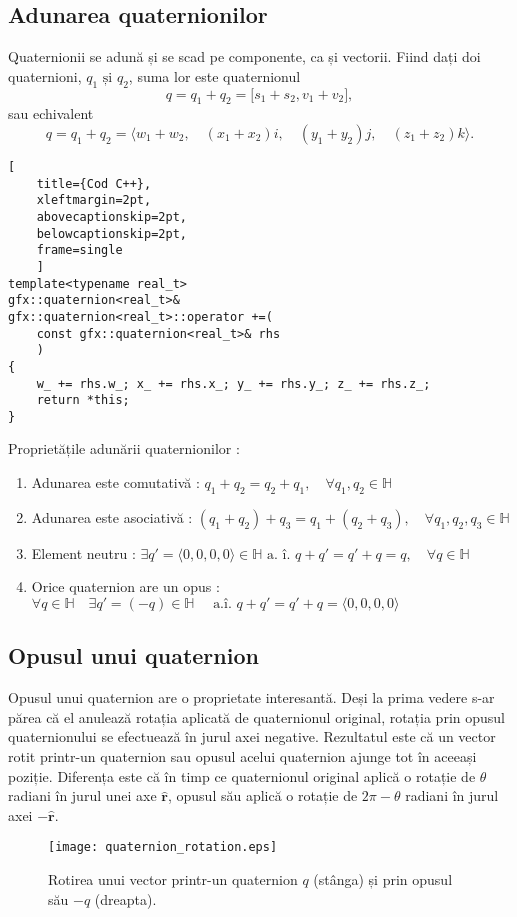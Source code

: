 \subsection{Adunarea quaternionilor}
\label{ch1:quaternions:addition}
Quaternionii se adună și se scad pe componente, ca și vectorii.
Fiind dați doi quaternioni, $q_1 \text{ și } q_2$, suma lor este quaternionul
\begin{equation}
q = q_1 + q_2 = \lbrack s_1 + s_2, v_1 + v_2 \rbrack,
\end{equation} sau echivalent
\begin{equation}
q = q_1 + q_2 = \langle w_1 + w_2, \quad (x_1 + x_2)i, \quad (y_1 + y_2)j, 
\quad (z_1 + z_2)k \rangle.
\end{equation}

\begin{lstlisting}[
    title={Cod C++}, 
    xleftmargin=2pt,
    abovecaptionskip=2pt,
    belowcaptionskip=2pt,
    frame=single
    ]
template<typename real_t>
gfx::quaternion<real_t>&
gfx::quaternion<real_t>::operator +=(
    const gfx::quaternion<real_t>& rhs
    )
{
    w_ += rhs.w_; x_ += rhs.x_; y_ += rhs.y_; z_ += rhs.z_;
    return *this;
}

\end{lstlisting}

\noindent
Proprietățile adunării quaternionilor :
\begin{enumerate}
    \item Adunarea este comutativă : 
    $q_1 + q_2 = q_2 + q_1, \quad \forall q_1, q_2 \in \mathbb{H}$
    \item Adunarea este asociativă :
    $(q_1 + q_2) + q_3 = q_1 + (q_2 + q_3), \quad \forall q_1, q_2, q_3
    \in \mathbb{H}$
    \item Element neutru : $\exists q' = \langle 0, 0, 0, 0 \rangle \in 
    \mathbb{H} \text{ a. î. } q + q' = q' + q = q, \quad \forall q \in
    \mathbb{H}$ 
    \item Orice quaternion are un opus : $\forall q \in \mathbb{H} \quad
    \exists q' = (-q) \in \mathbb{H} \quad \text{ a.î. } q + q' = q' + q = 
    \langle 0, 0, 0, 0 \rangle$
\end{enumerate}

\subsection{Opusul unui quaternion}
Opusul unui quaternion are o proprietate interesantă. Deși la prima vedere s-ar
părea că el anulează rotația aplicată de quaternionul original, 
rotația prin opusul quaternionului se efectuează în jurul axei negative. 
Rezultatul este că un vector rotit printr-un quaternion sau opusul acelui 
quaternion ajunge tot în aceeași poziție. Diferența este că în timp ce 
quaternionul original aplică o rotație de $\theta$ radiani în jurul
unei axe $\mathbf{\hat{r}}$, opusul său aplică o rotație de $2\pi - \theta$
radiani în jurul axei $\mathbf{-\hat{r}}$.
\begin{figure}
\texttt{[image: quaternion\_rotation.eps]}
\caption{Rotirea unui vector printr-un quaternion $q$ (stânga) și prin opusul său
$-q$ (dreapta).}
\label{fig:quat_rotation}
\end{figure}

